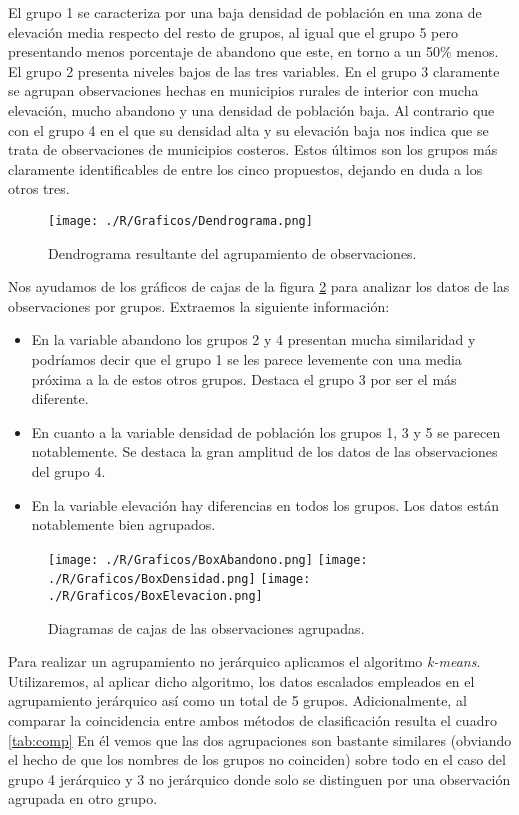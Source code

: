 \documentclass[11pt,a4paper]{article}
\begin{document}
{\color{dkgreen}El grupo 1 se caracteriza por una baja densidad de población en una zona de elevación media respecto del resto de grupos, al igual que el grupo 5 pero presentando menos porcentaje de abandono que este, en torno a un 50\% menos. El grupo 2 presenta niveles bajos de las tres variables. En el grupo 3 claramente se agrupan observaciones hechas en municipios rurales de interior con mucha elevación, mucho abandono y una densidad de población baja. Al contrario que con el grupo 4 en el que su densidad alta y su elevación baja nos indica que se trata de observaciones de municipios costeros. Estos últimos son los grupos más claramente identificables de entre los cinco propuestos, dejando en duda a los otros tres.}

\begin{figure}
\centering
\texttt{[image: ./R/Graficos/Dendrograma.png]}
\caption{Dendrograma resultante del agrupamiento de observaciones.}
\label{fig:dendro}
\end{figure}

Nos ayudamos de los gráficos de cajas de la figura \ref{fig:box} para analizar los datos de las observaciones por grupos. Extraemos la siguiente información:
\begin{itemize}
\item En la variable abandono los grupos 2 y 4 presentan mucha similaridad y podríamos decir que el grupo 1 se les parece levemente con una media próxima a la de estos otros grupos. Destaca el grupo 3 por ser el más diferente.
\item En cuanto a la variable densidad de población los grupos 1, 3 y 5 se parecen notablemente. Se destaca la gran amplitud de los datos de las observaciones del grupo 4.
\item En la variable elevación hay diferencias en todos los grupos. Los datos están notablemente bien agrupados.
\end{itemize}

\begin{figure}
\centering
\texttt{[image: ./R/Graficos/BoxAbandono.png]}
\texttt{[image: ./R/Graficos/BoxDensidad.png]}
\texttt{[image: ./R/Graficos/BoxElevacion.png]}
\caption{Diagramas de cajas de las observaciones agrupadas.}
\label{fig:box}
\end{figure}

Para realizar un agrupamiento no jerárquico aplicamos el algoritmo \textit{k-means}. Utilizaremos, al aplicar dicho algoritmo, los datos escalados empleados en el agrupamiento jerárquico así como un total de 5 grupos. Adicionalmente, al comparar la coincidencia entre ambos métodos de clasificación resulta el cuadro \ref{tab:comp} En él vemos que las dos agrupaciones son bastante similares (obviando el hecho de que los nombres de los grupos no coinciden) sobre todo en el caso del grupo 4 jerárquico y 3 no jerárquico donde solo se distinguen por una observación agrupada en otro grupo.
\end{document}
